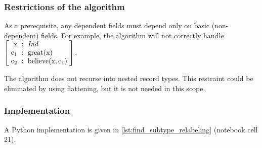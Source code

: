 \subsubsection{Restrictions of the algorithm}

As a prerequisite, any dependent fields must depend only on basic (non-dependent) fields.
For example, the algorithm will not correctly handle $\rec{
\text{x} &:& \type{Ind} \\
\text{c}_1 &:& \text{great}(\text{x}) \\
\text{c}_2 &:& \text{believe}(\text{x}, \text{c}_1)
}$.

The algorithm does not recurse into nested record types.
This restraint could be eliminated by using flattening, but it is not needed in this scope.




\subsubsection{Implementation}

A Python implementation is given in \autoref{lst:find_subtype_relabeling} (notebook cell 21).


